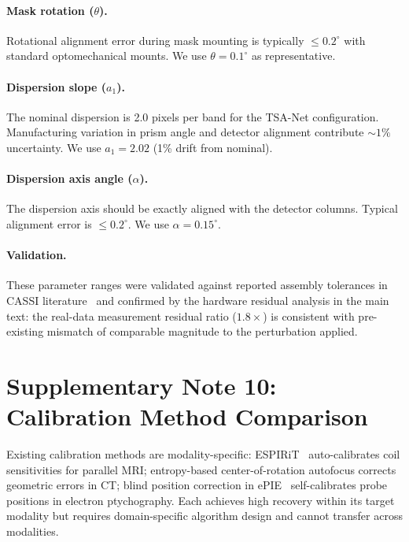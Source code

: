 \documentclass[11pt]{article}
\begin{document}
\paragraph{Mask rotation ($\theta$).}
Rotational alignment error during mask mounting is typically
$\leq 0.2^\circ$ with standard optomechanical mounts.  We use
$\theta = 0.1^\circ$ as representative.

\paragraph{Dispersion slope ($a_1$).}
The nominal dispersion is 2.0 pixels per band for the TSA-Net
configuration.  Manufacturing variation in prism angle and detector
alignment contribute $\sim 1\%$ uncertainty.  We use $a_1 = 2.02$
(1\% drift from nominal).

\paragraph{Dispersion axis angle ($\alpha$).}
The dispersion axis should be exactly aligned with the detector columns.
Typical alignment error is $\leq 0.2^\circ$.  We use
$\alpha = 0.15^\circ$.

\paragraph{Validation.}
These parameter ranges were validated against reported assembly
tolerances in CASSI literature~\cite{wagadarikar2008cassi} and confirmed
by the hardware residual analysis in the main text: the real-data
measurement residual ratio ($1.8\times$) is consistent with pre-existing
mismatch of comparable magnitude to the perturbation applied.


\newpage
\section{Supplementary Note 10: Calibration Method Comparison}
\label{sec:calibration_comparison}

Existing calibration methods are modality-specific: ESPIRiT~\cite{uecker2014espirit} auto-calibrates coil sensitivities for parallel MRI; entropy-based center-of-rotation autofocus corrects geometric errors in CT; blind position correction in ePIE~\cite{maiden2009ptychography} self-calibrates probe positions in electron ptychography. Each achieves high recovery within its target modality but requires domain-specific algorithm design and cannot transfer across modalities.
\end{document}
